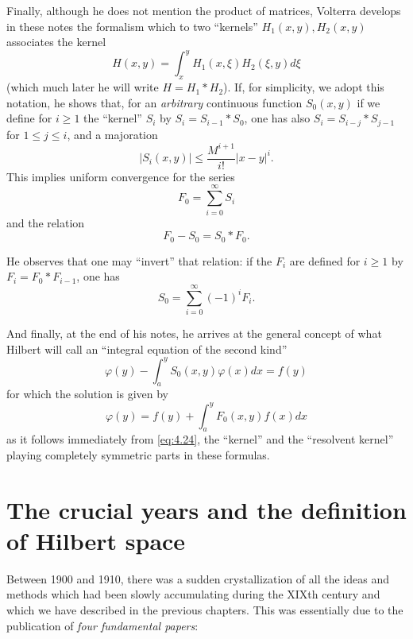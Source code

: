 \documentclass[12pt,a4paper,leqno,twoside]{extbook}
\begin{document}
Finally, although he does not mention the product of matrices, Volterra develops in these notes the formalism which to two ``kernels'' \(H_1(x,y), H_2(x,y)\) associates the kernel
\[
    H(x, y) = \int_x^y H_1(x, \xi) H_2(\xi, y) d\xi
\]
(which much later he will write \(H = H_1 \ast H_2\)). If, for simplicity, we adopt this notation, he shows that, for an \emph{arbitrary} continuous function \(S_0(x,y)\) if we define for \(i \geq 1\) the ``kernel'' \(S_i\) by \(S_i = S_{i-1} \ast S_0\), one has also \(S_i = S_{i-j} \ast S_{j-1}\) for \(1 \leq j \leq i\), and a majoration
\[
    |S_i(x, y)| \leq \frac{M^{i+1}}{i!} |x-y|^i.
\]
This implies uniform convergence for the series
\begin{equation}
    \label{eq:4.23}
    F_0 = \sum_{i=0}^\infty S_i
\end{equation}
and the relation
\begin{equation}
    \label{eq:4.24}
    F_0 - S_0 = S_0 \ast F_0.
\end{equation}

He observes that one may ``invert'' that relation: if the \(F_i\) are defined for \(i \geq 1\) by \(F_i = F_0 \ast F_{i-1}\), one has
\begin{equation}
    \label{eq:4.25}
    S_0 = \sum_{i=0}^\infty (-1)^i F_i.
\end{equation}

And finally, at the end of his notes, he arrives at the general concept of what Hilbert will call an ``integral equation of the second kind''
\begin{equation}
    \label{eq:4.26}
    \varphi(y) - \int_a^y S_0(x, y) \varphi(x) dx = f(y)
\end{equation}
for which the solution is given by
\begin{equation}
    \label{eq:4.27}
    \varphi(y) = f(y) + \int_a^y F_0(x, y) f(x) dx
\end{equation}
as it follows immediately from \eqref{eq:4.24}, the ``kernel'' and the ``resolvent kernel'' playing completely symmetric parts in these formulas.

\chapter{The crucial years and the definition of Hilbert space}
\label{ch:5}
\setcounter{equation}{0}

Between 1900 and 1910, there was a sudden crystallization of all the ideas and methods which had been slowly accumulating during the XIXth century and which we have described in the previous chapters. This was essentially due to the publication of \emph{four fundamental papers}:
\end{document}
